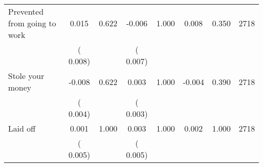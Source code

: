 \begin{tabular}{l*{7}{c}}
 Prevented from going to work       &              0.015       &        0.622  &             -0.006       &        1.000  &              0.008       &              0.350 &  2718 \\ 
                       &       (       0.008)             &                               &       (       0.007)                     &                               &                                               &                                &                      \\ 

 Stole your money       &             -0.008       &        0.622  &              0.003       &        1.000  &             -0.004       &              0.390 &  2718 \\ 
                       &       (       0.004)             &                               &       (       0.003)                     &                               &                                               &                                &                      \\ 

 Laid off       &              0.001       &        1.000  &              0.003       &        1.000  &              0.002       &              1.000 &  2718 \\ 
                       &       (       0.005)             &                               &       (       0.005)                     &                               &                                               &                                &                      \\ 

\hline \end{tabular}